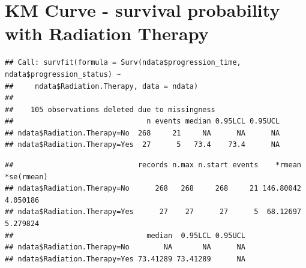 \documentclass[
  11pt,
]{article}
\newenvironment{Shaded}{\begin{snugshade}}{\end{snugshade}}
\newcommand{\AttributeTok}[1]{\textcolor[rgb]{0.77,0.63,0.00}{#1}}
\newcommand{\FunctionTok}[1]{\textcolor[rgb]{0.00,0.00,0.00}{#1}}
\newcommand{\NormalTok}[1]{#1}
\newcommand{\OtherTok}[1]{\textcolor[rgb]{0.56,0.35,0.01}{#1}}
\newcommand{\SpecialCharTok}[1]{\textcolor[rgb]{0.00,0.00,0.00}{#1}}
\newcommand{\StringTok}[1]{\textcolor[rgb]{0.31,0.60,0.02}{#1}}
\begin{document}
\newpage
\section{KM Curve - survival probability with Radiation Therapy}

\begin{Shaded}
\end{Shaded}

\begin{verbatim}
## Call: survfit(formula = Surv(ndata$progression_time, ndata$progression_status) ~ 
##     ndata$Radiation.Therapy, data = ndata)
## 
##    105 observations deleted due to missingness 
##                               n events median 0.95LCL 0.95UCL
## ndata$Radiation.Therapy=No  268     21     NA      NA      NA
## ndata$Radiation.Therapy=Yes  27      5   73.4    73.4      NA
\end{verbatim}

\begin{Shaded}
\end{Shaded}

\begin{verbatim}
##                             records n.max n.start events    *rmean *se(rmean)
## ndata$Radiation.Therapy=No      268   268     268     21 146.80042   4.050186
## ndata$Radiation.Therapy=Yes      27    27      27      5  68.12697   5.279824
##                               median  0.95LCL 0.95UCL
## ndata$Radiation.Therapy=No        NA       NA      NA
## ndata$Radiation.Therapy=Yes 73.41289 73.41289      NA
\end{verbatim}
\end{document}
